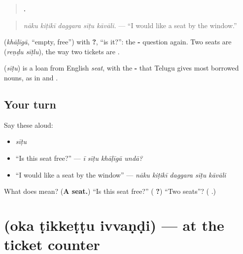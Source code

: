 \begin{quote}
\textbf{    .}
\end{quote}

\begin{quote}
\emph{nāku kiṭikī daggara sīṭu kāvāli.} — \textquotedblleft{}I would like a seat by the window.\textquotedblright{}
\end{quote}

\textbf{} (\emph{khāḷīgā}, \textquotedblleft{}empty, free\textquotedblright{}) with \textbf{?}, \textquotedblleft{}is it?\textquotedblright{}: the \textbf{-} question again. Two seats are \textbf{ } (\emph{reṇḍu sīṭlu}), the way two tickets are \textbf{}.

\begin{cousinweb}
\textbf{} (\emph{sīṭu}) is a loan from English \emph{seat}, with the \textbf{-} that Telugu gives most borrowed nouns, as in \textbf{} and \textbf{}.
\end{cousinweb}

\subsection*{Your turn}
Say these aloud:

\begin{itemize}
\raggedright
  \item \emph{sīṭu}
  \item \textquotedblleft{}Is this seat free?\textquotedblright{} — \emph{ī sīṭu khāḷīgā undā?}
  \item \textquotedblleft{}I would like a seat by the window\textquotedblright{} — \emph{nāku kiṭikī daggara sīṭu kāvāli}
\end{itemize}

\begin{tcolorbox}[breakable,colback=teal!4,colframe=teal!35!black,title={Before you move on}]
What does \textbf{} mean? (\textbf{A seat.}) \textquotedblleft{}Is this seat free?\textquotedblright{} (\textbf{   ?}) \textquotedblleft{}Two seats\textquotedblright{}? (\textbf{ }.)
\end{tcolorbox}
\section[\texorpdfstring{\te{ఒక} \te{టిక్కెట్టు} \te{ఇవ్వండి} (oka ṭikkeṭṭu ivvaṇḍi)}{ఒక టిక్కెట్టు ఇవ్వండి (oka ṭikkeṭṭu ivvaṇḍi)}]{   (oka ṭikkeṭṭu ivvaṇḍi) — at the ticket counter}

